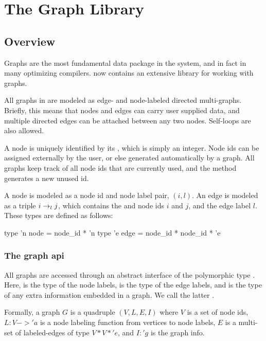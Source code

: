 \section{The Graph Library}

\subsection{Overview}

Graphs are the most fundamental data package in the \MLRISC{} system,
and in fact in many optimizing compilers.
\MLRISC{} now contains an extensive library for working with graphs.

All graphs in \MLRISC{} 
are modeled as edge- and node-labeled directed multi-graphs.
Briefly, this means that nodes and edges can carry user supplied data, and  
multiple directed edges can be attached between any two nodes.
Self-loops are also allowed.

A node is uniquely identified by its , which is
simply an integer.  Node ids can be assigned externally 
by the user, or else generated automatically by a graph.  All graphs
keep track of all node ids that are currently used,
and the method  generates a new unused id.

A node is modeled as a node id and node label pair, $(i,l)$.
An edge is modeled as a triple $i \rightarrow_{l} j$, which contains
the  and  node ids $i$ and $j$,
and the edge label $l$.  These types are defined as follows:
\begin{SML}
   type 'n node = node_id * 'n 
   type 'e edge = node_id * node_id * 'e
\end{SML}

\subsubsection{The graph api}

All graphs are accessed through an abstract interface
of the polymorphic type .
Here,  is the type of the node labels,  is the type
of the edge labels, and  is the type of any extra information
embedded in a graph.  We call the latter .

Formally, a graph $G$ is a quadruple $(V,L,E,I)$
where $V$ is a set of node ids, $L : V -> 'a$ is a node labeling
function from vertices to node labels, $E$ is a multi-set
of labeled-edges of type $V * V * 'e$, and $I: 'g$
is the graph info.

